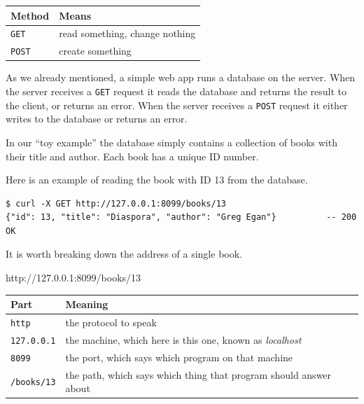 \documentclass[11pt,a4paper]{article}
\begin{document}
\begin{center}
\begin{tabular}{ll}
\toprule
\textbf{Method} & \textbf{Means} \\
\midrule
\texttt{GET}    & read something, change nothing \\
\texttt{POST}   & create something \\
\bottomrule
\end{tabular}
\end{center}

As we already mentioned, a simple web app runs a database on the server. When the server receives
a \texttt{GET} request it reads the database and returns the result to the client, or returns an
error. When the server receives a \texttt{POST} request it either writes to the database or returns
an error.

In our ``toy example'' the database simply contains a collection of books with their title and
author. Each book has a unique ID number.

Here is an example of reading the book with ID 13 from the database.

\begin{lstlisting}[language=SH]
$ curl -X GET http://127.0.0.1:8099/books/13
{"id": 13, "title": "Diaspora", "author": "Greg Egan"}          -- 200 OK
\end{lstlisting}

It is worth breaking down the address of a single book.

\begin{center}
\colorbox{codebg}{\begin{minipage}{0.95\linewidth}\centering\ttfamily\small
\setlength{\fboxsep}{1.5pt}\vspace{1.6mm}
\mbox{\colorbox{linebg}{http}://\colorbox{hdrbg}{127.0.0.1}:\colorbox{bdybg}{8099}\colorbox{pathbg}{/books/13}}
\vspace{1.6mm}
\end{minipage}}
\end{center}

\begin{center}\small
\begin{tabular}{@{}ll@{}}
\toprule
\textbf{Part} & \textbf{Meaning} \\
\midrule
\colorbox{linebg}{\texttt{http}}      & the protocol to speak \\
\colorbox{hdrbg}{\texttt{127.0.0.1}}  & the machine, which here is this one, known as \emph{localhost} \\
\colorbox{bdybg}{\texttt{8099}}       & the port, which says which program on that machine \\
\colorbox{pathbg}{\texttt{/books/13}} & the path, which says which thing that program should answer about \\
\bottomrule
\end{tabular}
\end{center}
\end{document}
